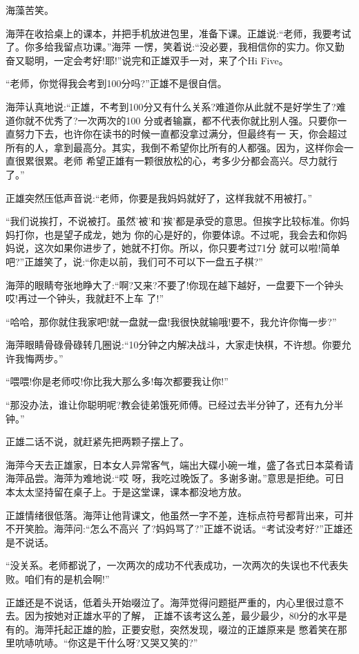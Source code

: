 \documentclass[11pt,a4paper,onecolumn]{article}
\begin{document}
海藻苦笑。

海萍在收拾桌上的课本，并把手机放进包里，准备下课。正雄说:``老师，我要考试了。你多给我留点功课。''海萍
一愣，笑着说:``没必要，我相信你的实力。你又勤奋又聪明，一定会考好!耶!''说完和正雄双手一对，来了个Hi
Five。

``老师，你觉得我会考到100分吗?''正雄不是很自信。

海萍认真地说:``正雄，不考到100分又有什么关系?难道你从此就不是好学生了?难道你就不优秀了?一次两次的100
分或者输赢，都不代表你就比别人强。只要你一直努力下去，也许你在读书的时候一直都没拿过满分，但最终有一
天，你会超过所有的人，拿到最高分。其实，我倒不希望你比所有的人都强。因为，这样你会一直很累很累。老师
希望正雄有一颗很放松的心，考多少分都会高兴。尽力就行了。''

正雄突然压低声音说:``老师，你要是我妈妈就好了，这样我就不用被打。''

``我们说挨打，不说被打。虽然'被'和'挨'都是承受的意思。但挨字比较标准。你妈妈打你，也是望子成龙，她为
你的心是好的，你要体谅。不过呢，我会去和你妈妈说，这次如果你进步了，她就不打你。所以，你只要考过71分
就可以啦!简单吧?''正雄笑了，说:``你走以前，我们可不可以下一盘五子棋?''

海萍的眼睛夸张地睁大了:``啊?又来?不要了!你现在越下越好，一盘要下一个钟头哎!再过一个钟头，我就赶不上车
了!''

``哈哈，那你就住我家吧!就一盘就一盘!我很快就输哦!要不，我允许你悔一步?''

海萍眼睛骨碌骨碌转几圈说:``10分钟之内解决战斗，大家走快棋，不许想。你要允许我悔两步。''

``喂喂!你是老师哎!你比我大那么多!每次都要我让你!''

``那没办法，谁让你聪明呢?教会徒弟饿死师傅。已经过去半分钟了，还有九分半钟。''

正雄二话不说，就赶紧先把两颗子摆上了。

海萍今天去正雄家，日本女人异常客气，端出大碟小碗一堆，盛了各式日本菜肴请海萍品尝。海萍为难地说:``哎
呀，我吃过晚饭了。多谢多谢。''意思是拒绝。可日本太太坚持留在桌子上。于是这堂课，课本都没地方放。

正雄情绪很低落。海萍让他背课文，他虽然一字不差，连标点符号都背出来，可并不开笑脸。海萍问:``怎么不高兴
了?妈妈骂了?''正雄不说话。``考试没考好?''正雄还是不说话。

``没关系。老师都说了，一次两次的成功不代表成功，一次两次的失误也不代表失败。咱们有的是机会啊!''

正雄还是不说话，低着头开始啜泣了。海萍觉得问题挺严重的，内心里很过意不去。因为按她对正雄水平的了解，
正雄不该考这么差，最少最少，80分的水平是有的。海萍托起正雄的脸，正要安慰，突然发现，啜泣的正雄原来是
憋着笑在那里吭哧吭哧。``你这是干什么呀?又哭又笑的?''
\end{document}
